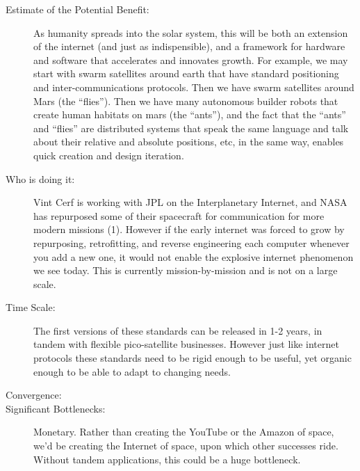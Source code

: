 \begin{description}
\item[Estimate of the Potential Benefit:] As humanity spreads into the solar system, this will be both   an extension of the internet (and just as indispensible), and a   framework for hardware and software that accelerates and innovates   growth. For example, we may start with swarm satellites around earth   that have standard positioning and inter-communications protocols. Then   we have swarm satellites around Mars (the ``flies''). Then we have many   autonomous builder robots that create human habitats on mars (the   ``ants''), and the fact that the ``ants'' and ``flies'' are distributed  systems that speak the same language and talk about their relative and   absolute positions, etc, in the same way, enables quick creation and   design iteration.
 
\item[Who is doing it:]
Vint Cerf is working with \gls{JPL} on   the Interplanetary Internet, and NASA has repurposed some of their  spacecraft for communication for more modern missions (1). However if   the early internet was forced to grow by repurposing, retrofitting, and   reverse engineering each computer whenever you add a new one, it would   not enable the explosive internet phenomenon we see today. This is   currently mission-by-mission and is not on a large scale.
 
\item[Time Scale:] The first   versions of these standards can be released in 1-2 years, in tandem  with  flexible pico-satellite businesses. However just like internet   protocols these standards need to be rigid enough to be useful, yet   organic enough to be able to adapt to changing needs.
 
\item[Convergence:] 
 
\item[Significant Bottlenecks:]   Monetary. Rather than creating the YouTube or the Amazon of space, we'd   be creating the Internet of space, upon which other successes ride.   Without tandem applications, this could be a huge bottleneck.
 
\cite{ipsnig}
\end{description}

 
